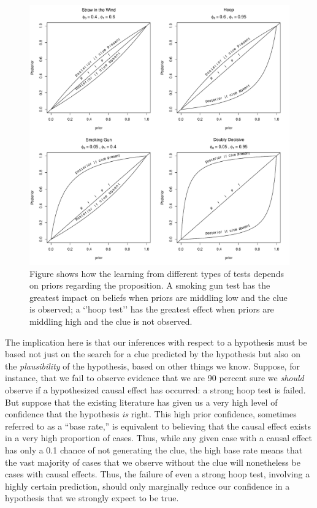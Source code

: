 \documentclass[12pt,]{book}
\begin{document}
\begin{figure}
\centering
\includegraphics{ii_files/figure-latex/CluesInferences2-1.pdf}
\caption{\label{fig:CluesInferences2}Figure shows how the learning from different types of tests depends on priors regarding the proposition. A smoking gun test has the greatest impact on beliefs when priors are middling low and the clue is observed; a `'hoop test'' has the greatest effect when priors are middling high and the clue is not observed.}
\end{figure}

The implication here is that our inferences with respect to a hypothesis must be based not just on the search for a clue predicted by the hypothesis but also on the \emph{plausibility} of the hypothesis, based on other things we know. Suppose, for instance, that we fail to observe evidence that we are 90 percent sure we \emph{should} observe if a hypothesized causal effect has occurred: a strong hoop test is failed. But suppose that the existing literature has given us a very high level of confidence that the hypothesis \emph{is} right. This high prior confidence, sometimes referred to as a ``base rate,'' is equivalent to believing that the causal effect exists in a very high proportion of cases. Thus, while any given case with a causal effect has only a 0.1 chance of not generating the clue, the high base rate means that the vast majority of cases that we observe without the clue will nonetheless be cases with causal effects. Thus, the failure of even a strong hoop test, involving a highly certain prediction, should only marginally reduce our confidence in a hypothesis that we strongly expect to be true.
\end{document}

